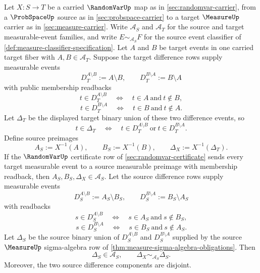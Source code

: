 \begin{theorem}
\label{thm:randomvar-preimage-symmetric-difference-exactness}
Let $X:S\to T$ be a carried $\RandomVarUp$ map as in \autoref{sec:randomvar-carrier}, from a $\ProbSpaceUp$ source as in \autoref{sec:probspace-carrier} to a target $\MeasureUp$ carrier as in \autoref{sec:measure-carrier}. Write $\mathcal{A}_S$ and $\mathcal{A}_T$ for the source and target measurable-event families, and write $E\sim_{\mathcal{A}_S}F$ for the source event classifier of \autoref{def:measure-classifier-specification}. Let $A$ and $B$ be target events in one carried target fiber with $A,B\in\mathcal{A}_T$. Suppose the target difference rows supply measurable events
$$
D_T^{A\setminus B}:=A\setminus B,\qquad D_T^{B\setminus A}:=B\setminus A
$$
with public membership readbacks
$$
t\in D_T^{A\setminus B}\quad\Longleftrightarrow\quad t\in A\ \text{and}\ t\notin B,
$$
$$
t\in D_T^{B\setminus A}\quad\Longleftrightarrow\quad t\in B\ \text{and}\ t\notin A.
$$
Let $\Delta_T$ be the displayed target binary union of these two difference events, so
$$
t\in\Delta_T\quad\Longleftrightarrow\quad t\in D_T^{A\setminus B}\ \text{or}\ t\in D_T^{B\setminus A}.
$$
Define source preimages
$$
A_S:=X^{-1}(A),\qquad B_S:=X^{-1}(B),\qquad \Delta_X:=X^{-1}(\Delta_T).
$$
If the $\RandomVarUp$ certificate row of \autoref{sec:randomvar-certificate} sends every target measurable event to a source measurable preimage with membership readback, then $A_S,B_S,\Delta_X\in\mathcal{A}_S$. Let the source difference rows supply measurable events
$$
D_S^{A\setminus B}:=A_S\setminus B_S,\qquad D_S^{B\setminus A}:=B_S\setminus A_S
$$
with readbacks
$$
s\in D_S^{A\setminus B}\quad\Longleftrightarrow\quad s\in A_S\ \text{and}\ s\notin B_S,
$$
$$
s\in D_S^{B\setminus A}\quad\Longleftrightarrow\quad s\in B_S\ \text{and}\ s\notin A_S.
$$
Let $\Delta_S$ be the source binary union of $D_S^{A\setminus B}$ and $D_S^{B\setminus A}$ supplied by the source $\MeasureUp$ sigma-algebra row of \autoref{thm:measure-sigma-algebra-obligations}. Then
$$
\Delta_S\in\mathcal{A}_S,\qquad \Delta_X\sim_{\mathcal{A}_S}\Delta_S.
$$
Moreover, the two source difference components are disjoint.
\end{theorem}

